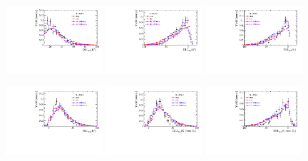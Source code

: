 \begin{figure}[h]
\includegraphics[height=!,width=0.32\textwidth]{figs/dataVsMC/signal_pid/PID_Ds2KKpi_1_K_plus_PIDK.pdf}
\includegraphics[height=!,width=0.32\textwidth]{figs/dataVsMC/signal_pid/PID_Ds2KKpi_1_pi_plus_PIDK.pdf}
\includegraphics[height=!,width=0.32\textwidth]{figs/dataVsMC/signal_pid/PID_Ds2KKpi_1_pi_minus_PIDK.pdf}

\includegraphics[height=!,width=0.32\textwidth]{figs/dataVsMC/signal_pid/PID_Ds2KKpi_1_K_plus_fromDs_PIDK.pdf}
\includegraphics[height=!,width=0.32\textwidth]{figs/dataVsMC/signal_pid/PID_Ds2KKpi_1_K_minus_fromDs_PIDK.pdf}
\includegraphics[height=!,width=0.32\textwidth]{figs/dataVsMC/signal_pid/PID_Ds2KKpi_1_pi_minus_fromDs_PIDK.pdf}
\caption{}
\label{fig:}
\end{figure}

